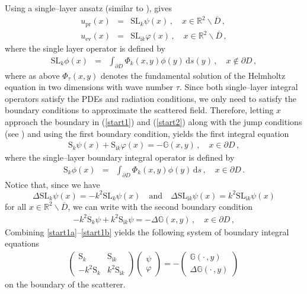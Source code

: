 \documentclass{article}
\numberwithin{equation}{section}
\begin{document}
{Using a single--layer ansatz (similar to \cite{clampedTEexist}), gives
\begin{eqnarray}
 u_{\text{pr}}(x)&=&\mathrm{SL}_{k}\psi(x)\,,\quad x\in\mathbb{R}^2 \backslash \overline{D}\,,\label{start1}\\
 u_{\text{ev}}(x)&=&\mathrm{SL}_{\mathrm{i}k}\varphi(x)\,,\quad x\in\mathbb{R}^2 \backslash \overline{D}\,,
 \label{start2}
\end{eqnarray}
where the single layer operator is defined by
\begin{eqnarray*}
\mathrm{SL}_{k}\phi(x)&=&\int_{\partial D}\Phi_k(x,y)\phi(y)\,\mathrm{d}s(y)\,,\quad  x\notin \partial D\,,
\end{eqnarray*}
where as above $\Phi_\tau (x,y)$ denotes the fundamental solution of the Helmholtz equation in two dimensions with wave number $\tau$. Since both single--layer integral operators satisfy  the PDEs and radiation conditions, we only need to satisfy the boundary conditions to approximate the scattered field. Therefore, letting $x$ approach the boundary in (\ref{start1}) and (\ref{start2}) along with the jump conditions (see \cite[Theorem 3.1]{coltonkress}) and using the first boundary condition, yields the first integral equation 
\begin{eqnarray}
 \mathrm{S}_{k}\psi(x)+\mathrm{S}_{\mathrm{i}k}\varphi(x)=-\mathbb{G}(x,y)\,,\quad x\in\partial D\,,\label{start1a}
\end{eqnarray}
where the single--layer boundary integral operator is defined by
\begin{eqnarray*}
    \mathrm{S}_{k}\phi(x)&=&\int_{\partial D}\Phi_k(x,y)\phi(y)\,\mathrm{d}s\,,\quad x\in \partial D\,.
\end{eqnarray*}
Notice that, since we have
$$\Delta \mathrm{SL}_{k}\psi(x)=-k^2 \mathrm{SL}_{k}\psi(x) \quad \text{and} \quad  \Delta \mathrm{SL}_{\mathrm{i}k}\psi(x) = k^2 \mathrm{SL}_{\mathrm{i}k}\psi(x) $$
for all $x\in\mathbb{R}^2 \backslash \overline{D}$, we can write with the second boundary condition
\begin{eqnarray}
-k^2 \mathrm{S}_{k}\psi+k^2 \mathrm{S}_{\mathrm{i}k}\psi=-\Delta \mathbb{G}(x,y) \,,\quad x\in\partial D\,,\label{start1b}
\end{eqnarray}
Combining \eqref{start1a}--\eqref{start1b} yields the following system of boundary integral equations
\begin{eqnarray*}
 \begin{pmatrix}
 \mathrm{S}_{k} & \mathrm{S}_{\mathrm{i}k}\\
 -k^2 \mathrm{S}_{k} & k^2 \mathrm{S}_{\mathrm{i}k}
\end{pmatrix}
 \begin{pmatrix}
 \psi\\
 \varphi
 \end{pmatrix}
 =-
 \begin{pmatrix}
 \mathbb{G}(\cdot \, ,y)\\
 \Delta \mathbb{G}(\cdot \, ,y)
 \end{pmatrix}\,
\end{eqnarray*}
on the boundary of the scatterer. 


}
\end{document}
